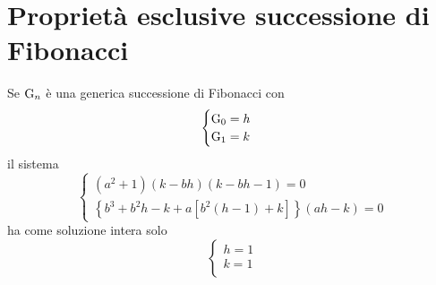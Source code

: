 \section{Proprietà esclusive successione di Fibonacci}
\begin{thm}\label{thm:FibSistCaratteristico}
Se $\mathrm{G}_{n}$ è una generica successione di Fibonacci con
\[\begin{cases}
\mathrm{G}_{0}=h\\
\mathrm{G}_{1}=k\\
\end{cases}\] il sistema 
\begin{equation*}
	\left\{
\begin{array}{l}
	(a^2+1)(k-bh)(k-bh-1)=0\\
	\left\{b^3+b^2h-k+a\left[b^2\left(h-1\right)+k\right]\right\}\left(ah-k\right)=0
\end{array}
\right.
\end{equation*}
ha come soluzione intera solo \[\begin{cases}
	h=1\\
	k=1\\
\end{cases}\]
\end{thm}
